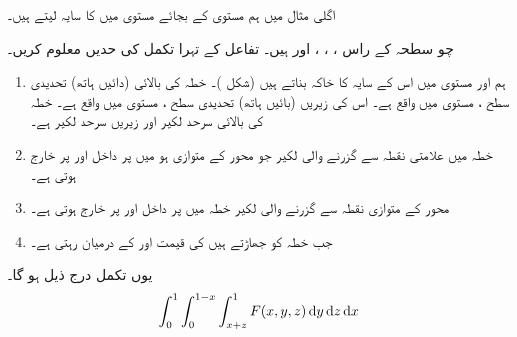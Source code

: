 اگلی مثال میں ہم  مستوی  کے بجائے مستوی  میں  کا سایہ لیتے ہیں۔

چو سطحہ   کے راس ، ،  ، اور  ہیں۔ تفاعل  کے تہرا تکمل کی حدیں معلوم کریں۔

\begin{enumerate}[1.]
\item
{}\quad
ہم  اور مستوی  میں اس کے  سایہ  کا خاکہ بناتے ہیں (شکل )۔ خطہ  کی بالائی (دائیں ہاتھ)  تحدیدی سطح    ، مستوی  میں واقع  ہے۔ اس کی زیریں (بائیں ہاتھ) تحدیدی سطح ، مستوی  میں واقع  ہے۔ خطہ  کی بالائی  سرحد لکیر   اور زیریں سرحد لکیر  ہے۔
\item
{}\quad
خطہ  میں علامتی نقطہ   سے گزرنے والی  لکیر  جو محور  کے متوازی ہو  میں  پر داخل اور  پر خارج ہوتی ہے۔
\item
{}\quad
محور  کے متوازی نقطہ  سے گزرنے والی لکیر  خطہ   میں  پر داخل اور  پر خارج ہوتی ہے۔
\item
{}\quad
جب خطہ   کو    جھاڑتے ہیں کی قیمت  اور    کے درمیان رہتی ہے۔
\end{enumerate}
یوں تکمل درج ذیل ہو گا۔
\begin{align*}
\int_0^1\int_0^{1-x}\int_{x+z}^1F(x,y,z)\dif y\dif z\dif x
\end{align*}
